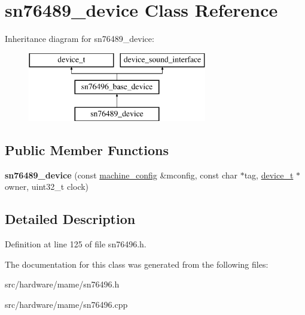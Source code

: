 \hypertarget{classsn76489__device}{\section{sn76489\-\_\-device Class Reference}
\label{classsn76489__device}
}
Inheritance diagram for sn76489\-\_\-device\-:\begin{figure}[H]
\begin{center}
\leavevmode
\includegraphics[height=3.000000cm]{classsn76489__device}
\end{center}
\end{figure}
\subsection*{Public Member Functions}
\begin{DoxyCompactItemize}
\item 
\hypertarget{classsn76489__device_a1af1b677c2d095615c05fa03d4c3d55b}{{\bfseries sn76489\-\_\-device} (const \hyperlink{structmachine__config}{machine\-\_\-config} \&mconfig, const char $\ast$tag, \hyperlink{classdevice__t}{device\-\_\-t} $\ast$owner, uint32\-\_\-t clock)}\label{classsn76489__device_a1af1b677c2d095615c05fa03d4c3d55b}

\end{DoxyCompactItemize}


\subsection{Detailed Description}


Definition at line 125 of file sn76496.\-h.



The documentation for this class was generated from the following files\-:\begin{DoxyCompactItemize}
\item 
src/hardware/mame/sn76496.\-h\item 
src/hardware/mame/sn76496.\-cpp\end{DoxyCompactItemize}
